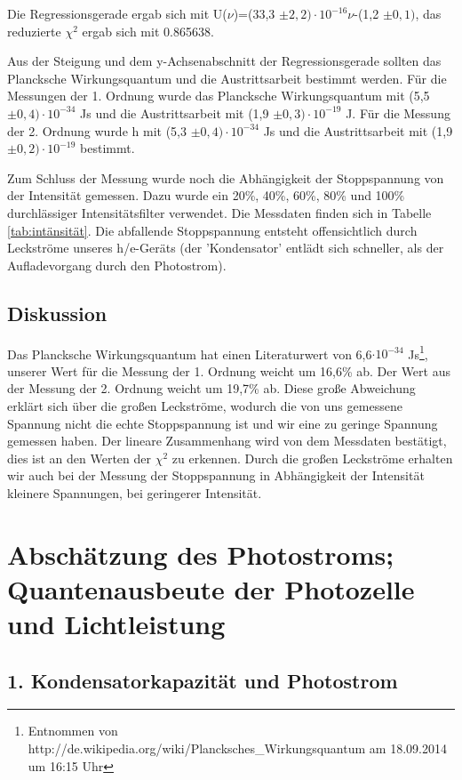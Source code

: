 \documentclass[12px]{scrartcl}
\begin{document}
Die Regressionsgerade ergab sich mit U($\nu$)=(33,3 $\pm 2,2)\cdot10^{-16} \nu$-(1,2 $\pm 0,1)$, das reduzierte $\chi^2$ ergab sich mit 0.865638.

Aus der Steigung und dem y-Achsenabschnitt der Regressionsgerade sollten das Plancksche Wirkungsquantum und die Austrittsarbeit bestimmt werden. Für die Messungen der 1. Ordnung wurde das Plancksche Wirkungsquantum mit (5,5 $\pm 0,4)\cdot10^{-34}$ Js und die Austrittsarbeit mit (1,9 $\pm 0,3)\cdot10^{-19}$ J. Für die Messung der 2. Ordnung wurde h mit (5,3 $\pm 0,4)\cdot10^{-34}$ Js und die Austrittsarbeit mit (1,9 $\pm 0,2)\cdot10^{-19}$ bestimmt.

Zum Schluss der Messung wurde noch die Abhängigkeit der Stoppspannung von der Intensität gemessen. Dazu wurde ein 20\%, 40\%, 60\%, 80\% und 100\% durchlässiger Intensitätsfilter  verwendet. Die Messdaten finden sich in Tabelle \ref{tab:intänsität}. Die abfallende Stoppspannung entsteht offensichtlich durch Leckströme unseres h/e-Geräts (der 'Kondensator' entlädt sich schneller, als der Aufladevorgang durch den Photostrom).

\subsection{Diskussion}
Das Plancksche Wirkungsquantum hat einen Literaturwert von 6,6$\cdot 10^{-34}$ Js\footnote{Entnommen von http://de.wikipedia.org/wiki/Plancksches\_Wirkungsquantum am  18.09.2014 um 16:15 Uhr}, unserer Wert für die Messung der 1. Ordnung weicht um 16,6\% ab. Der Wert aus der Messung der 2. Ordnung weicht um 19,7\% ab. Diese große  Abweichung erklärt sich über die großen Leckströme, wodurch die von uns gemessene Spannung nicht die echte Stoppspannung ist und wir eine zu geringe Spannung gemessen haben. Der lineare Zusammenhang wird von dem Messdaten bestätigt, dies ist an den Werten der $\chi^2$ zu erkennen. Durch die großen Leckströme erhalten wir auch bei der Messung der Stoppspannung in Abhängigkeit der Intensität kleinere Spannungen, bei geringerer Intensität.

\section{Abschätzung des Photostroms; Quantenausbeute der Photozelle und Lichtleistung}
\subsection{1. Kondensatorkapazität und Photostrom}
\end{document}
